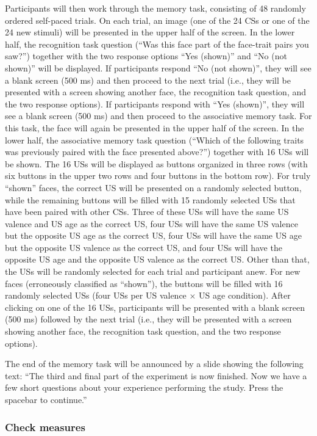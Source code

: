 \documentclass[
  doc,floatsintext]{apa6}
\begin{document}
Participants will then work through the memory task, consisting of 48 randomly ordered self-paced trials.
On each trial, an image (one of the 24 CSs or one of the 24 new stimuli) will be presented in the upper half of the screen.
In the lower half, the recognition task question (``Was this face part of the face-trait pairs you saw?'') together with the two response options ``Yes (shown)'' and ``No (not shown)'' will be displayed.
If participants respond ``No (not shown)'', they will see a blank screen (500 ms) and then proceed to the next trial (i.e., they will be presented with a screen showing another face, the recognition task question, and the two response options).
If participants respond with ``Yes (shown)'', they will see a blank screen (500 ms) and then proceed to the associative memory task.
For this task, the face will again be presented in the upper half of the screen.
In the lower half, the associative memory task question (``Which of the following traits was previously paired with the face presented above?'') together with 16 USs will be shown.
The 16 USs will be displayed as buttons organized in three rows (with six buttons in the upper two rows and four buttons in the bottom row).
For truly ``shown'' faces, the correct US will be presented on a randomly selected button, while the remaining buttons will be filled with 15 randomly selected USs that have been paired with other CSs.
Three of these USs will have the same US valence and US age as the correct US, four USs will have the same US valence but the opposite US age as the correct US, four USs will have the same US age but the opposite US valence as the correct US, and four USs will have the opposite US age and the opposite US valence as the correct US.
Other than that, the USs will be randomly selected for each trial and participant anew.
For new faces (erroneously classified as ``shown''), the buttons will be filled with 16 randomly selected USs (four USs per US valence \(\times\) US age condition). After clicking on one of the 16 USs, participants will be presented with a blank screen (500 ms) followed by the next trial (i.e., they will be presented with a screen showing another face, the recognition task question, and the two response options).

The end of the memory task will be announced by a slide showing the following text:
``The third and final part of the experiment is now finished.
Now we have a few short questions about your experience performing the study.
Press the spacebar to continue.''

\subsubsection{Check measures}\label{check-measures}
\end{document}
